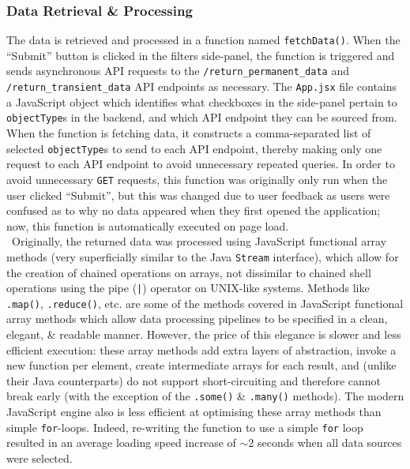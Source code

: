 \documentclass[a4paper,11pt]{report}
\begin{document}
\subsubsection{Data Retrieval \& Processing}
The data is retrieved and processed in a function named \texttt{fetchData()}.
When the ``Submit'' button is clicked in the filters side-panel, the function is triggered and sends asynchronous API requests to the \verb|/return_permanent_data| and \verb|/return_transient_data| API endpoints as necessary.
The \verb|App.jsx| file contains a JavaScript object which identifies what checkboxes in the side-panel pertain to \verb|objectType|s in the backend, and which API endpoint they can be sourced from.
When the function is fetching data, it constructs a comma-separated list of selected \verb|objectType|s to send to each API endpoint, thereby making only one request to each API endpoint to avoid unnecessary repeated queries.
In order to avoid unnecessary \verb|GET| requests, this function was originally only run when the user clicked ``Submit'', but this was changed due to user feedback as users were confused as to why no data appeared when they first opened the application;
now, this function is automatically executed on page load.
\\\
Originally, the returned data was processed using JavaScript functional array methods\supercite{arraymethods} (very superficially similar to the Java \texttt{Stream}\supercite{javastream} interface), which allow for the creation of chained operations on arrays, not dissimilar to chained shell operations using the pipe (\texttt{|}) operator on UNIX-like systems\supercite{redhatpipe}.
Methods like \texttt{.map()}, \texttt{.reduce()}, etc. are some of the methods covered in JavaScript functional array methods which allow data processing pipelines to be specified in a clean, elegant, \& readable manner.
However, the price of this elegance is slower and less efficient execution:
these array methods add extra layers of abstraction, invoke a new function per element, create intermediate arrays for each result, and (unlike their Java counterparts) do not support short-circuiting and therefore cannot break early (with the exception of the \texttt{.some()} \& \texttt{.many()} methods)\supercite{shortcircuit}.
The modern JavaScript engine also is less efficient at optimising these array methods than simple \texttt{for}-loops\supercite{jsmethodopti}.
Indeed, re-writing the function to use a simple \texttt{for} loop resulted in an average loading speed increase of $\sim$2 seconds when all data sources were selected. 
\end{document}
